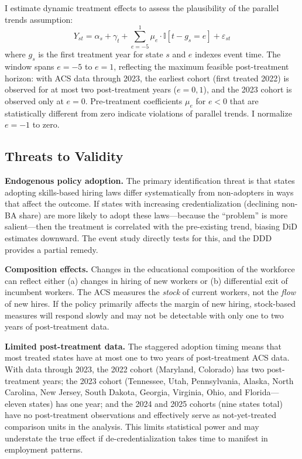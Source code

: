 \documentclass[12pt]{article}
\newcommand{\ind}{\mathbb{I}}
\begin{document}
I estimate dynamic treatment effects to assess the plausibility of the parallel trends assumption:
\begin{equation} \label{eq:eventstudy}
Y_{st} = \alpha_s + \gamma_t + \sum_{e=-5}^{1} \mu_e \cdot \ind[t - g_s = e] + \varepsilon_{st}
\end{equation}
where $g_s$ is the first treatment year for state $s$ and $e$ indexes event time. The window spans $e = -5$ to $e = 1$, reflecting the maximum feasible post-treatment horizon: with ACS data through 2023, the earliest cohort (first treated 2022) is observed for at most two post-treatment years ($e = 0, 1$), and the 2023 cohort is observed only at $e = 0$. Pre-treatment coefficients $\mu_e$ for $e < 0$ that are statistically different from zero indicate violations of parallel trends. I normalize $e = -1$ to zero.

\subsection{Threats to Validity}

\textbf{Endogenous policy adoption.} The primary identification threat is that states adopting skills-based hiring laws differ systematically from non-adopters in ways that affect the outcome. If states with increasing credentialization (declining non-BA share) are more likely to adopt these laws---because the ``problem'' is more salient---then the treatment is correlated with the pre-existing trend, biasing DiD estimates downward. The event study directly tests for this, and the DDD provides a partial remedy.

\textbf{Composition effects.} Changes in the educational composition of the workforce can reflect either (a) changes in hiring of new workers or (b) differential exit of incumbent workers. The ACS measures the \emph{stock} of current workers, not the \emph{flow} of new hires. If the policy primarily affects the margin of new hiring, stock-based measures will respond slowly and may not be detectable with only one to two years of post-treatment data.

\textbf{Limited post-treatment data.} The staggered adoption timing means that most treated states have at most one to two years of post-treatment ACS data. With data through 2023, the 2022 cohort (Maryland, Colorado) has two post-treatment years; the 2023 cohort (Tennessee, Utah, Pennsylvania, Alaska, North Carolina, New Jersey, South Dakota, Georgia, Virginia, Ohio, and Florida---eleven states) has one year; and the 2024 and 2025 cohorts (nine states total) have no post-treatment observations and effectively serve as not-yet-treated comparison units in the analysis. This limits statistical power and may understate the true effect if de-credentialization takes time to manifest in employment patterns.
\end{document}
